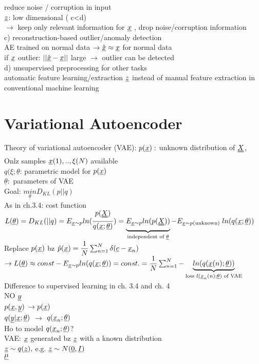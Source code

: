 reduce noise / corruption in input\\
$  {\underline z}  $: low dimensional ( c<d) \\
$ \rightarrow $ keep only relevant information for $ {\underline x} $ , drop noise/corruption information\\
 c) reconstruction-based outlier/anomaly detection\\
\textbullet AE trained on normal data $ \rightarrow  \hat{{\underline x}} \approx {\underline x} $ for normal data \\
\textbullet if $  {\underline x} $ outlier:  $  || \hat{{\underline x}} - {\underline x} || $ large $ \rightarrow $ outlier can be detected \\
 d) unsupervised preprocessing for other tasks\\
 \textbullet automatic feature learning/extraction $  {\underline z} $ instead of manual feature extraction in conventional machine learning
\section{Variational Autoencoder}
Theory of variational autoencoder (VAE):
$ p({\underline x}):  $ unknown distribution of $ \X $,\\
Onlz samples $ {\underline x}(1),.., \xi(N) $ available\\
$ q(\xi; \underline{\theta} $: parametric model for $ p({\underline x}) $\\
$ \underline{\theta}: $ parameters of VAE\\
Goal: $ \underset{\underline{\theta}}{min} D_{KL} (p|| q) $\\
As in ch.3.4: 
cost function $ L(\underline{\theta}) = D_{KL} (|| q) = E _{\x \sim p} ln( \dfrac  {p(\X)}  {q(\x ;\underline{\theta})  }) =
\underbrace{E_{\x \sim p} ln(p(\X))}_{\text{independent of } \underline{\theta}}- E_{\x \sim p(\text{unknown) }} ln(q(\x
;\underline{\theta}))$\\
Replace $ p({\underline x})  $ bz $ \hat{p}({\underline x})  = \dfrac{1}{N} \sum_{n=1}^{N} \delta ({\underline c} - {\underline x}_n)$\\
$ \rightarrow L(\underline{\theta}) \approx const - E_{{\underline x} \sim p} ln (q({\underline x} ; \underline{\theta})) = const. = \dfrac{1}{N} \sum_{n=1}^{N} - \underbrace{ln (q({\underline x} (n) ; \underline{\theta}) )}_{\text{loss } l({\underline x}_n(n) ; \underline{\theta}) \text{ of VAE}}$\\
Difference to supervised learning in ch. 3.4 and ch. 4\\
\textbullet NO $ {\underline y} $ \\
\textbullet $ p({\underline x} ,{\underline y}) $ $ \rightarrow  p({\underline x})$\\
$ q({\underline y} | {\underline x} ; \underline{\theta}) $ $ \rightarrow $ $ q({\underline x}_n; \underline{\theta}) $\\
Ho to model $ q({\underline x}_n; \underline{\theta}) $?\\
VAE: $ {\underline x} $ generated bz $ {\underline z} $ with a known distribution \\
$ {\underline z} \sim q({\underline z}) ,  $ e.g. $ {\underline z} \sim N(\underline{0}, {\underline I}) $\\
$ \underline{\mu}\\  $